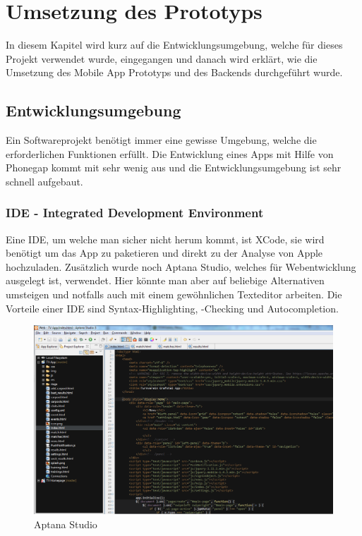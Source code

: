 %
%

\chapter{Umsetzung des Prototyps}\label{chap.umsetzung}
In diesem Kapitel wird kurz auf die Entwicklungsumgebung, welche für dieses Projekt verwendet wurde, eingegangen und danach wird erklärt, wie die Umsetzung des Mobile App Prototyps und des Backends durchgeführt wurde.

\section{Entwicklungsumgebung}\label{entwicklungsumgebung}
Ein Softwareprojekt benötigt immer eine gewisse Umgebung, welche die erforderlichen Funktionen erfüllt. Die Entwicklung eines Apps mit Hilfe von Phonegap kommt mit sehr wenig aus und die Entwicklungsumgebung ist sehr schnell aufgebaut.

\subsection{IDE - Integrated Development Environment}
Eine IDE, um welche man sicher nicht herum kommt, ist XCode, sie wird benötigt um das App zu paketieren und direkt zu der Analyse von Apple hochzuladen. Zusätzlich wurde noch Aptana Studio, welches für Webentwicklung ausgelegt ist, verwendet. Hier könnte man aber auf beliebige Alternativen umsteigen und notfalls auch mit einem gewöhnlichen Texteditor arbeiten. Die Vorteile einer IDE sind Syntax-Highlighting, -Checking und Autocompletion.

\begin{figure}[h]
\centering
\includegraphics[scale=0.5]{images/aptana.png}
\caption{Aptana Studio}
\label{fig:aptana}
\end{figure}


